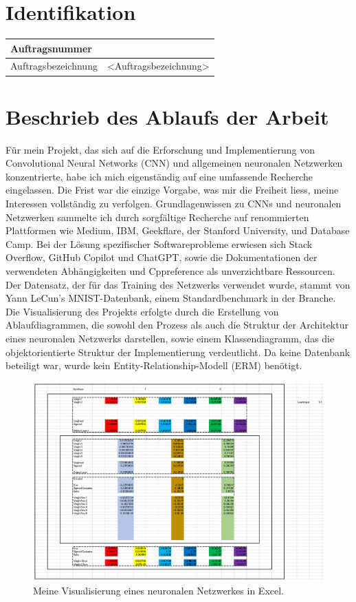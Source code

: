 \section{Identifikation}
\begin{xltabular}{\linewidth}{|l|l|}
	\hline
	Auftragsnummer & 
	\\\hline
	Auftragsbezeichnung & <Auftragsbezeichnung>
	\\\hline
\end{xltabular}
\label{tab:IdentifikationTable}

\section{Beschrieb des Ablaufs der Arbeit}
Für mein Projekt, das sich auf die Erforschung und Implementierung von Convolutional Neural Networks (CNN) und allgemeinen neuronalen Netzwerken konzentrierte, habe ich mich eigenständig auf eine umfassende Recherche eingelassen. Die Frist war die einzige Vorgabe, was mir die Freiheit liess, meine Interessen vollständig zu verfolgen. Grundlagenwissen zu CNNs und neuronalen Netzwerken sammelte ich durch sorgfältige Recherche auf renommierten Plattformen wie Medium, IBM, Geekflare, der Stanford University, und Database Camp. Bei der Lösung spezifischer Softwareprobleme erwiesen sich Stack Overflow, GitHub Copilot und ChatGPT, sowie die Dokumentationen der verwendeten Abhängigkeiten und Cppreference als unverzichtbare Ressourcen. Der Datensatz, der für das Training des Netzwerks verwendet wurde, stammt von Yann LeCun’s MNIST-Datenbank, einem Standardbenchmark in der Branche.
\\
Die Visualisierung des Projekts erfolgte durch die Erstellung von Ablaufdiagrammen, die sowohl den Prozess als auch die Struktur der Architektur eines neuronalen Netzwerks darstellen, sowie einem Klassendiagramm, das die objektorientierte Struktur der Implementierung verdeutlicht. Da keine Datenbank beteiligt war, wurde kein Entity-Relationship-Modell (ERM) benötigt.
\begin{figure}[H]
	\centering
		\includegraphics[width=\linewidth]{visualisierungKI.png}
		\caption{Meine Visualisierung eines neuronalen Netzwerkes in Excel.}
	\label{fig:visualisierungKI}
\end{figure}

